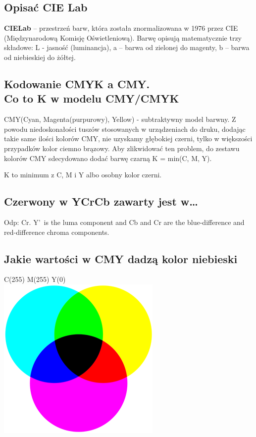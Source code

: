 \documentclass[a4paper, 12pt, titlepage]{article}
\begin{document}
\subsection{Opisać CIE Lab}
\textbf{CIELab} – przestrzeń barw, która została znormalizowana w 1976 przez CIE (Międzynarodową Komisję Oświetleniową). Barwę opisują matematycznie trzy składowe: L - jasność (luminancja), a – barwa od zielonej do magenty, b – barwa od niebieskiej do żółtej.
	
\subsection{Kodowanie CMYK a CMY. \\ Co to K w modelu CMY/CMYK}
CMY(Cyan, Magenta(purpurowy), Yellow) - subtraktywny model barwny.
Z powodu niedoskonałości tuszów stosowanych w urządzeniach do druku, dodając takie same ilości kolorów CMY, nie uzyskamy głębokiej czerni, tylko w większości przypadków kolor ciemno brązowy. Aby zlikwidować ten problem, do zestawu kolorów CMY sdecydowano dodać barwę czarną K = min(C, M, Y).\par
K to minimum z C, M i Y albo osobny kolor czerni.

\subsection{Czerwony w YCrCb zawarty jest w…}
Odp: Cr. Y\textquoteright~is the luma component and Cb and Cr are the blue-difference and red-difference chroma components.

\subsection{Jakie wartości w CMY dadzą kolor niebieski}
C(255) M(255) Y(0) \\
\includegraphics[scale=0.8]{CMY_ideal.png}
\end{document}
